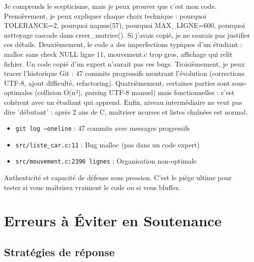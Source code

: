 \documentclass[12pt,a4paper]{article}
\begin{document}
\begin{reponse_longue}
Je comprends le scepticisme, mais je peux prouver que c'est mon code. Premièrement, je peux expliquer chaque choix technique : pourquoi TOLERANCE=2, pourquoi napms(57), pourquoi MAX\_LIGNE=600, pourquoi nettoyage cascade dans creer\_matrice(). Si j'avais copié, je ne saurais pas justifier ces détails. Deuxièmement, le code a des imperfections typiques d'un étudiant : malloc sans check NULL ligne 11, mouvement.c trop gros, affichage qui relit fichier. Un code copié d'un expert n'aurait pas ces bugs. Troisièmement, je peux tracer l'historique Git : 47 commits progressifs montrant l'évolution (corrections UTF-8, ajout difficulté, refactoring). Quatrièmement, certaines parties sont sous-optimales (collision O(n²), parsing UTF-8 manuel) mais fonctionnelles : c'est cohérent avec un étudiant qui apprend. Enfin, niveau intermédiaire ne veut pas dire 'débutant' : après 2 ans de C, maîtriser ncurses et listes chaînées est normal.
\end{reponse_longue}

\begin{reference_code}
\begin{itemize}
    \item \texttt{git log --oneline} : 47 commits avec messages progressifs
    \item \texttt{src/liste\_car.c:11} : Bug malloc (pas dans un code expert)
    \item \texttt{src/mouvement.c:2396 lignes} : Organisation non-optimale
\end{itemize}
\end{reference_code}

\begin{objectif_prof}
Authenticité et capacité de défense sous pression. C'est le piège ultime pour tester si vous maîtrisez vraiment le code ou si vous bluffez.
\end{objectif_prof}

\newpage

\section{Erreurs à Éviter en Soutenance}

\subsection{Stratégies de réponse}
\end{document}
